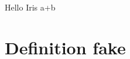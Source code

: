 \newcommand{\hello}[1]{Hello #1}
\def\pair#1#2{#1+#2}
\newenvironment{boxnote}{\begingroup}{\endgroup}
\hello{Iris} \pair{a}{b} 
\newcommand{\hidden}{\section{Definition fake}}
\hidden

